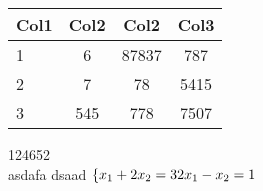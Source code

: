 \documentclass{article}
\begin{document}
\begin{center}
\begin{tabular}{||l c c c||} 
  \hline
  Col1 & Col2 & Col2 & Col3 \\ [0.5ex] 
  \hline\hline
  1 & 6 & 87837 & 787 \\ 
  \hline
  2 & 7 & 78 & 5415 \\
  \hline
  3 & 545 & 778 & 7507 \\ [1ex] 
  \hline
\end{tabular}
\end{center}

124652\\
  asdafa\vspace{7em}
  dsaad
$
\left\{
x_1+2x_2=3\\
2x_1-x_2=1\\
\right.
$
\end{document}
